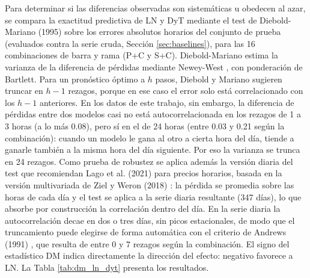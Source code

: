 Para determinar si las diferencias observadas son sistemáticas u obedecen al azar, se compara la exactitud predictiva de LN y DyT mediante el test de Diebold-Mariano (1995) sobre los errores absolutos horarios del conjunto de prueba (evaluados contra la serie cruda, Sección \ref{sec:baselines}), para las 16 combinaciones de barra y rama (P+C y S+C). Diebold-Mariano estima la varianza de la diferencia de pérdidas mediante Newey-West \cite{NeweyWest1987}, con ponderación de Bartlett. Para un pronóstico óptimo a $h$ pasos, Diebold y Mariano \cite{DieboldMariano1995} sugieren truncar en $h-1$ rezagos, porque en ese caso el error solo está correlacionado con los $h-1$ anteriores. En los datos de este trabajo, sin embargo, la diferencia de pérdidas entre dos modelos casi no está autocorrelacionada en los rezagos de 1 a 3 horas (a lo más 0.08), pero sí en el de 24 horas (entre 0.03 y 0.21 según la combinación): cuando un modelo le gana al otro a cierta hora del día, tiende a ganarle también a la misma hora del día siguiente. Por eso la varianza se trunca en 24 rezagos. Como prueba de robustez se aplica además la versión diaria del test que recomiendan Lago et al. (2021) \cite{Lago2021Review} para precios horarios, basada en la versión multivariada de Ziel y Weron (2018) \cite{ZielWeron2018}: la pérdida se promedia sobre las horas de cada día y el test se aplica a la serie diaria resultante (347 días), lo que absorbe por construcción la correlación dentro del día. En la serie diaria la autocorrelación decae en dos o tres días, sin picos estacionales, de modo que el truncamiento puede elegirse de forma automática con el criterio de Andrews (1991) \cite{Andrews1991}, que resulta de entre 0 y 7 rezagos según la combinación. El signo del estadístico DM indica directamente la dirección del efecto: negativo favorece a LN. La Tabla \ref{tab:dm_ln_dyt} presenta los resultados.

